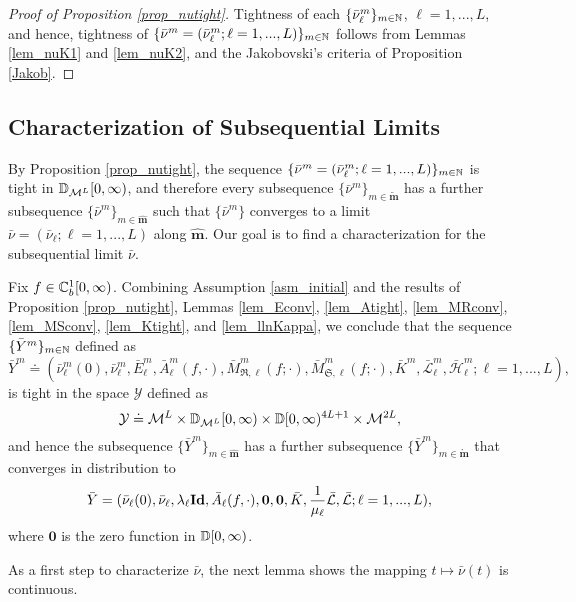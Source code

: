 \documentclass{article}
\theoremstyle{definition}
\numberwithin{equation}{section}
\begin{document}
\begin{proof}[Proof of Proposition \ref{prop_nutight}]
  Tightness of each $\{\bar\nu^m_\ell\}_{m\in\mathbb{N}}$, $\ell=1,...,L$, and hence,  tightness of $\{\bar{\nu}^m=(\bar{\nu}_\ell^m;\ell=1,...,L)\}_{m\in\mathbb{N}}$ follows from Lemmas \ref{lem_nuK1} and \ref{lem_nuK2}, and the Jakobovski's criteria of Proposition \ref{Jakob}.
\end{proof}

\subsection{Characterization of Subsequential Limits}\label{sec_limit}
By Proposition \ref{prop_nutight}, the sequence $\{\bar\nu^m=(\bar\nu^m_\ell;\ell=1,...,L)\}_{m\in\mathbb{N}}$ is tight in $\mathbb{D}_{\mathcal{M}^L}[0,\infty)$, and therefore every subsequence $\{\bar\nu^m\}_{m\in\mathbf{\tilde m}}$ has a further subsequence $\{\bar\nu^m\}_{m\in\mathbf{\hat m}}$ such that $\{\bar\nu^m\}$ converges to a limit $\bar\nu=(\bar\nu_\ell;\ell=1,...,L)$ along $\mathbf{\hat m}$. Our goal is to find a characterization for the subsequential limit $\bar\nu$.


Fix $f\in\mathbb{C}_b^{1}[0,\infty)$. Combining Assumption \ref{asm_initial} and the results of  Proposition \ref{prop_nutight}, Lemmas \ref{lem_Econv}, \ref{lem_Atight}, \ref{lem_MRconv}, \ref{lem_MSconv}, \ref{lem_Ktight}, and \ref{lem_llnKappa}, we conclude that the sequence $\{\bar Y^m\}_{m\in\mathbb{N}}$ defined as
\[\bar Y^m \doteq (\bar\nu_\ell^m(0),\bar\nu^m_\ell,\bar E^m_\ell,\bar A^m_\ell(f,\cdot),\bar M^m_{\mathfrak{R},\ell}(f;\cdot),\bar M^m_{\mathfrak{S},\ell}(f;\cdot),\bar K^m,\bar{\mathcal{L}}^m_\ell,\bar{\mathcal{H}}_\ell^m;\ell=1,...,L ), \]
is tight in the space $\mathcal{Y}$ defined as
\[
\mathcal{Y}\doteq\mathcal{M}^L\times\mathbb{D}_{\mathcal{M}^L}[0,\infty)\times \mathbb{D}[0,\infty)^{4L+1}\times \mathcal{M}^{2L},
\]
and hence the subsequence $\{\bar Y^m\}_{m\in\mathbf{\hat m}}$ has a further subsequence  $\{\bar Y^m\}_{m\in\mathbf{\mathring{ m}}}$
that converges in distribution to 
\[
\bar Y = (\bar\nu_\ell(0),\bar\nu_\ell,\lambda_\ell\textbf{Id},\bar A_\ell(f,\cdot),\mathbf{0},\mathbf{0},\bar K,\frac{1}{\mu_\ell}\bar{\mathcal{L}},\bar{\mathcal{L}};\ell=1,...,L ),
\]
where $\mathbf{0}$ is the zero function in $\mathbb{D}[0,\infty)$. 

As a first step to characterize $\bar\nu$, the next lemma shows the mapping $t\mapsto\bar\nu(t)$ is continuous.
\end{document}
